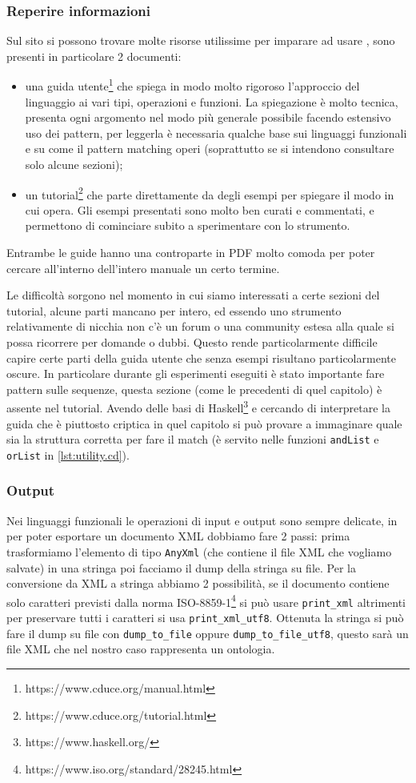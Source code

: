\subsubsection{Reperire informazioni}
Sul sito si possono trovare molte risorse utilissime per imparare ad usare \cduce, sono presenti in particolare 2 documenti:
\begin{itemize}
	\item una guida utente\footnote{https://www.cduce.org/manual.html} che spiega in modo molto rigoroso l'approccio del linguaggio ai vari tipi, operazioni e funzioni. La spiegazione è molto tecnica, presenta ogni argomento nel modo più generale possibile facendo estensivo uso dei pattern, per leggerla è necessaria qualche base sui linguaggi funzionali e su come il pattern matching operi (soprattutto se si intendono consultare solo alcune sezioni);
	\item un tutorial\footnote{https://www.cduce.org/tutorial.html} che parte direttamente da degli esempi per spiegare il modo in cui \cduce opera. Gli esempi presentati sono molto ben curati e commentati, e permettono di cominciare subito a sperimentare con lo strumento.
\end{itemize}
Entrambe le guide hanno una controparte in PDF molto comoda per poter cercare all'interno dell'intero manuale un certo termine.

Le difficoltà sorgono nel momento in cui siamo interessati a certe sezioni del tutorial, alcune parti mancano per intero, ed essendo uno strumento relativamente di nicchia non c'è un forum o una community estesa alla quale si possa ricorrere per domande o dubbi. Questo rende particolarmente difficile capire certe parti della guida utente che senza esempi risultano particolarmente oscure. In particolare durante gli esperimenti eseguiti è stato importante fare pattern sulle sequenze, questa sezione (come le precedenti di quel capitolo) è assente nel tutorial. Avendo delle basi di Haskell\footnote{https://www.haskell.org/} e cercando di interpretare la guida che è piuttosto criptica in quel capitolo si può provare a immaginare quale sia la struttura corretta per fare il match (è servito nelle funzioni \verb|andList| e \verb|orList| in \ref{lst:utility.cd}).
\subsubsection{Output}
Nei linguaggi funzionali le operazioni di input e output sono sempre delicate, in \cduce per poter esportare un documento XML dobbiamo fare 2 passi: prima trasformiamo l'elemento di tipo \verb|AnyXml| (che contiene il file XML che vogliamo salvate) in una stringa poi facciamo il dump della stringa su file. Per la conversione da XML a stringa abbiamo 2 possibilità, se il documento contiene solo caratteri previsti dalla norma  ISO-8859-1\footnote{https://www.iso.org/standard/28245.html} si può usare \verb|print_xml| altrimenti per preservare tutti i caratteri si usa \verb|print_xml_utf8|. Ottenuta la stringa si può fare il dump su file con \verb|dump_to_file| oppure \verb|dump_to_file_utf8|, questo sarà un file XML che nel nostro caso rappresenta un ontologia.

